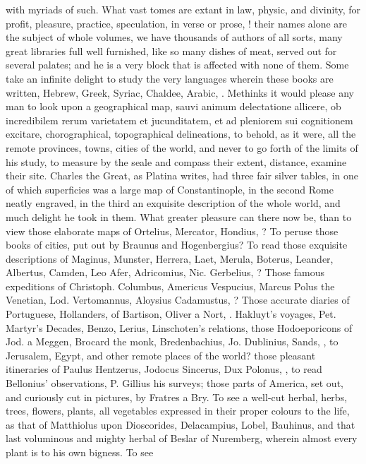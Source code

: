 {with myriads of such. What vast tomes are extant in law, physic, and
divinity, for profit, pleasure, practice, speculation, in verse or
prose, \etc{}! their names alone are the subject of whole volumes, we have
thousands of authors of all sorts, many great libraries full well
furnished, like so many dishes of meat, served out for several palates;
and he is a very block that is affected with none of them. Some take an
infinite delight to study the very languages wherein these books are
written, Hebrew, Greek, Syriac, Chaldee, Arabic, \etc{}. Methinks it would
please any man to look upon a geographical map, sauvi animum
delectatione allicere, ob incredibilem rerum varietatem et
jucunditatem, et ad pleniorem sui cognitionem excitare, chorographical,
topographical delineations, to behold, as it were, all the remote
provinces, towns, cities of the world, and never to go forth of the
limits of his study, to measure by the seale and compass their extent,
distance, examine their site. Charles the Great, as Platina writes, had
three fair silver tables, in one of which superficies was a large map
of Constantinople, in the second Rome neatly engraved, in the third an
exquisite description of the whole world, and much delight he took in
them. What greater pleasure can there now be, than to view those
elaborate maps of Ortelius, Mercator, Hondius, \etc{}? To peruse
those books of cities, put out by Braunus and Hogenbergius? To read
those exquisite descriptions of Maginus, Munster, Herrera, Laet,
Merula, Boterus, Leander, Albertus, Camden, Leo Afer, Adricomius, Nic.
Gerbelius, \etc{}? Those famous expeditions of Christoph. Columbus,
Americus Vespucius, Marcus Polus the Venetian, Lod. Vertomannus,
Aloysius Cadamustus, \etc{}? Those accurate diaries of Portuguese,
Hollanders, of Bartison, Oliver a Nort, \etc{}. Hakluyt's voyages, Pet.
Martyr's Decades, Benzo, Lerius, Linschoten's relations, those
Hodoeporicons of Jod. a Meggen, Brocard the monk, Bredenbachius, Jo.
Dublinius, Sands, \etc{}, to Jerusalem, Egypt, and other remote places of
the world? those pleasant itineraries of Paulus Hentzerus, Jodocus
Sincerus, Dux Polonus, \etc{}, to read Bellonius' observations, P. Gillius
his surveys; those parts of America, set out, and curiously cut in
pictures, by Fratres a Bry. To see a well-cut herbal, herbs, trees,
flowers, plants, all vegetables expressed in their proper colours to
the life, as that of Matthiolus upon Dioscorides, Delacampius, Lobel,
Bauhinus, and that last voluminous and mighty herbal of Beslar of
Nuremberg, wherein almost every plant is to his own bigness. To see
}
